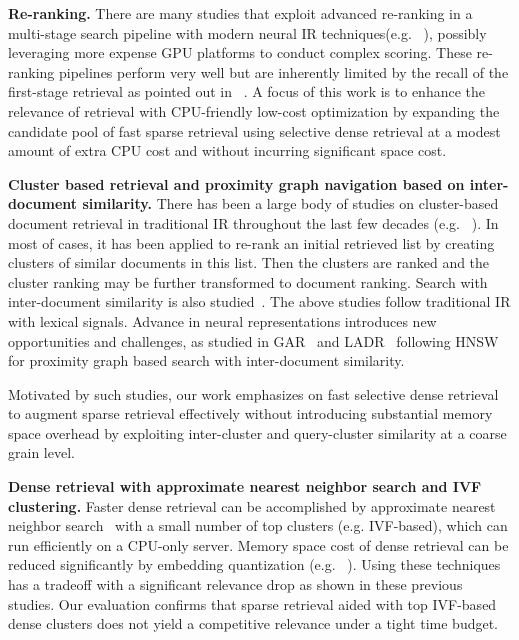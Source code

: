{\bf Re-ranking.} 
There  are many studies that exploit advanced re-ranking in a multi-stage search pipeline with modern
neural IR techniques(e.g. ~\cite{MacAvaney2019SIGIR-cedr, MacAvaney2020SIGIR-prettr, 2023SIGIR-ZhuangRankT5,Yang2022CQ,Zhuang2021TILDEv2,2022WWWforwardIndex}),
possibly leveraging more expense GPU platforms to conduct complex scoring.
These  re-ranking pipelines perform very well but are inherently limited by the recall of the first-stage retrieval
as pointed out in  ~\cite{2022CIKM-MacAvaneyGraphReRank, 2023SIGIR-LADR}. 
A  focus of this work is to enhance the relevance of retrieval with CPU-friendly low-cost optimization by expanding the candidate pool of  
fast sparse retrieval using selective  dense retrieval at a modest amount of extra CPU cost and without incurring significant  space cost.  

{\bf Cluster based retrieval and proximity graph navigation based on inter-document similarity.}
There has been a large body of studies on cluster-based document retrieval  in traditional IR
throughout the last few decades (e.g.  ~\cite{liu2004cluster,2022SIGIR-KurlandClusterRank,kurland2008opposite}).
In most of cases, it has been applied to re-rank an initial retrieved list by creating clusters of similar  documents in this list. Then the clusters are ranked and the cluster ranking may be further transformed to document ranking.  
Search with  inter-document similarity is  also studied~\cite{2006NAACL-docExpan}.
The above studies follow traditional IR   with  lexical signals. 
Advance in neural representations introduces new opportunities and challenges, as studied in  
GAR~\cite{2022CIKM-MacAvaneyGraphReRank} and LADR~\cite{2023SIGIR-LADR} following
HNSW~\cite{2020TPAMI-HNSW} for proximity graph based search with inter-document similarity.

Motivated by such studies, our work emphasizes on fast selective dense retrieval to augment sparse retrieval effectively
without introducing substantial memory space overhead  by exploiting  inter-cluster and query-cluster similarity at a coarse grain level. 

{\bf  Dense retrieval with approximate nearest neighbor search and IVF clustering.}
Faster dense retrieval can be accomplished by approximate nearest neighbor search~\cite{2021Facebook-DrBoost-Lewis, johnson2019billion} with 
a small number of top clusters  (e.g. IVF-based), which can run efficiently on a CPU-only  server.
Memory space cost of dense retrieval can be reduced significantly by 
embedding  quantization (e.g.  ~\cite{2021CIKM-JPQ-Zhan,  2022WSDM-Zhan-RepCONC, Xiao2022Distill-VQ}).
Using these techniques has a tradeoff with a significant relevance drop as shown in these previous studies. 
Our evaluation confirms  that sparse retrieval aided with top IVF-based dense clusters does not yield a competitive relevance 
under a tight time budget.  


